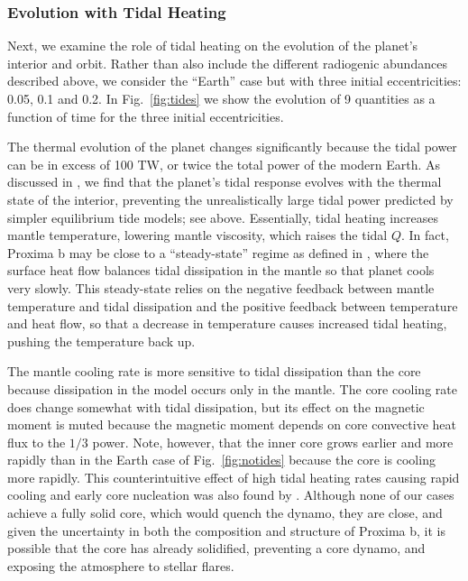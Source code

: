 \documentclass[preprint,12pt]{aastex}
\begin{document}
\subsubsection{Evolution with Tidal Heating}
\label{sec:results:internal:tides}

Next, we examine the role of tidal heating on the evolution of the planet's interior
and orbit. Rather than also include the different radiogenic
abundances described above, we consider the ``Earth'' case but with
three initial eccentricities: 0.05, 0.1 and 0.2. In
Fig.~\ref{fig:tides} we show the evolution of 9 quantities as a
function of time for the three initial eccentricities.

The thermal evolution of the planet changes significantly
because the tidal power can be in excess of 100 TW, or twice the total
power of the modern Earth. As discussed in \cite{DriscollBarnes15}, we find
that the planet's tidal  
response evolves with the thermal state of the
interior, preventing the unrealistically large tidal power predicted by
simpler equilibrium tide models;
 see above. Essentially, tidal heating 
increases mantle temperature,
lowering mantle viscosity,
which raises the tidal $Q$. In fact, Proxima b
may be close to a
 ``steady-state'' regime as defined in
\cite{DriscollBarnes15},
where the surface heat flow balances tidal dissipation in the mantle so that
planet cools very slowly.  This steady-state relies on the negative feedback between mantle 
temperature and tidal dissipation and the positive feedback between temperature and heat flow, 
so that a decrease in temperature causes increased tidal heating, pushing the temperature back up.

The mantle cooling rate is more sensitive to tidal dissipation than the core because dissipation 
in the model occurs only in the mantle.  The core cooling rate does change somewhat with tidal 
dissipation, but its effect on the magnetic moment is muted because the magnetic moment depends 
on core convective heat flux to the $1/3$ power.
 Note, however, that
the inner core grows earlier and more rapidly than in the
Earth case of Fig.~\ref{fig:notides} because the core is cooling more
rapidly. 
This counterintuitive effect of high tidal heating rates causing rapid cooling and
early core nucleation was also found by \cite{DriscollBarnes15}.
Although none of our cases achieve a fully
solid core, which would quench the dynamo, they are close, and given
the uncertainty in both the composition and structure of Proxima b, 
it is possible that the
core has already solidified, preventing a core dynamo, and exposing the atmosphere to
stellar flares.
\end{document}
